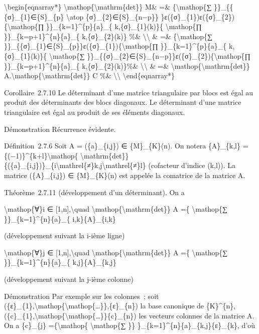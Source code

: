 \documentclass[]{article}
\begin{document}
\textbackslash{}begin\{eqnarray*\}
\textbackslash{}mathop\{\textbackslash{}mathrm\{det\}\} M\& =\&
\{\textbackslash{}mathop\{∑ \}\}\_\{\{ \{σ\}\_\{1\}∈\{S\}\_\{p\}
\textbackslash{}atop \{σ\}\_\{2\}∈\{S\}\_\{n−p\}\}
\}ε(\{σ\}\_\{1\})ε(\{σ\}\_\{2\})\{\textbackslash{}mathop\{∏
\}\}\_\{k=1\}\^{}\{p\}\{a\}\_\{ k,\{σ\}\_\{1\}(k)\}\{
\textbackslash{}mathop\{∏ \}\}\_\{k=p+1\}\^{}\{n\}\{a\}\_\{
k,\{σ\}\_\{2\}(k)\} \%\& \textbackslash{}\textbackslash{} \& =\&
\{\textbackslash{}mathop\{∑
\}\}\_\{\{σ\}\_\{1\}∈\{S\}\_\{p\}\}ε(\{σ\}\_\{1\})\{\textbackslash{}mathop\{∏
\}\}\_\{k=1\}\^{}\{p\}\{a\}\_\{ k,\{σ\}\_\{1\}(k)\}\{
\textbackslash{}mathop\{∑
\}\}\_\{\{σ\}\_\{2\}∈\{S\}\_\{n−p\}\}ε(\{σ\}\_\{2\})\{\textbackslash{}mathop\{∏
\}\}\_\{k=p+1\}\^{}\{n\}\{a\}\_\{ k,\{σ\}\_\{2\}(k)\}\%\&
\textbackslash{}\textbackslash{} \& =\&
\textbackslash{}mathop\{\textbackslash{}mathrm\{det\}\}
A.\textbackslash{}mathop\{\textbackslash{}mathrm\{det\}\} C \%\&
\textbackslash{}\textbackslash{} \textbackslash{}end\{eqnarray*\}

Corollaire~2.7.10 Le déterminant d'une matrice triangulaire par blocs
est égal au produit des déterminants des blocs diagonaux. Le déterminant
d'une matrice triangulaire est égal au produit de ses éléments
diagonaux.

Démonstration Récurrence évidente.

Définition~2.7.6 Soit A = (\{a\}\_\{i,j\}) ∈ \{M\}\_\{K\}(n). On notera
\{A\}\_\{k,l\} = \{(−1)\}\^{}\{k+l\}\textbackslash{}mathop\{
\textbackslash{}mathrm\{det\}\}
\{(\{a\}\_\{i,j\})\}\_\{i\textbackslash{}mathrel\{≠\}k,j\textbackslash{}mathrel\{≠\}l\}
(cofacteur d'indice (k,l)). La matrice (\{A\}\_\{i,j\}) ∈
\{M\}\_\{K\}(n) est appelée la comatrice de la matrice A.

Théorème~2.7.11 (développement d'un déterminant). On a

\textbackslash{}mathop\{∀\}i ∈ {[}1,n{]},\textbackslash{}quad
\textbackslash{}mathop\{\textbackslash{}mathrm\{det\}\} A =\{
\textbackslash{}mathop\{∑ \}\}\_\{k=1\}\^{}\{n\}\{a\}\_\{
i,k\}\{A\}\_\{i,k\}

(développement suivant la i-ième ligne)

\textbackslash{}mathop\{∀\}j ∈ {[}1,n{]},\textbackslash{}quad
\textbackslash{}mathop\{\textbackslash{}mathrm\{det\}\} A =\{
\textbackslash{}mathop\{∑ \}\}\_\{k=1\}\^{}\{n\}\{a\}\_\{
k,j\}\{A\}\_\{k,j\}

(développement suivant la j-ième colonne)

Démonstration Par exemple sur les colonnes~; soit
(\{ε\}\_\{1\},\textbackslash{}mathop\{\textbackslash{}mathop\{\ldots{}\}\},\{ε\}\_\{n\})
la base canonique de \{K\}\^{}\{n\},
(\{c\}\_\{1\},\textbackslash{}mathop\{\textbackslash{}mathop\{\ldots{}\}\}\{c\}\_\{n\})
les vecteurs colonnes de la matrice A. On a \{c\}\_\{j\}
=\{\textbackslash{}mathop\{ \textbackslash{}mathop\{∑ \}\}
\}\_\{k=1\}\^{}\{n\}\{a\}\_\{k,j\}\{ε\}\_\{k\}, d'où
\end{document}
